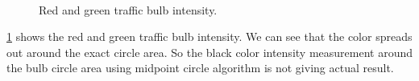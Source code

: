 \begin{figure}[ht]
\centering
{}
\hfill
{}\\

\caption{Red and green traffic bulb intensity.}
\label{f:bulb_int}
\end{figure}

\ref{f:bulb_int} shows the red and green traffic bulb intensity.
We can see that the color spreads out around the exact circle area.
So the black color intensity measurement around the bulb circle area using midpoint circle algorithm is not giving actual result.

